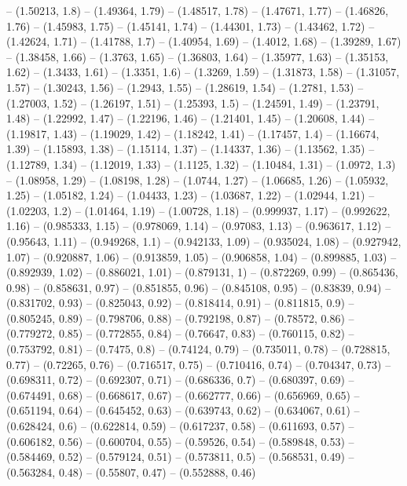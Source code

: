 -- (1.50213, 1.8)
-- (1.49364, 1.79)
-- (1.48517, 1.78)
-- (1.47671, 1.77)
-- (1.46826, 1.76)
-- (1.45983, 1.75)
-- (1.45141, 1.74)
-- (1.44301, 1.73)
-- (1.43462, 1.72)
-- (1.42624, 1.71)
-- (1.41788, 1.7)
-- (1.40954, 1.69)
-- (1.4012, 1.68)
-- (1.39289, 1.67)
-- (1.38458, 1.66)
-- (1.3763, 1.65)
-- (1.36803, 1.64)
-- (1.35977, 1.63)
-- (1.35153, 1.62)
-- (1.3433, 1.61)
-- (1.3351, 1.6)
-- (1.3269, 1.59)
-- (1.31873, 1.58)
-- (1.31057, 1.57)
-- (1.30243, 1.56)
-- (1.2943, 1.55)
-- (1.28619, 1.54)
-- (1.2781, 1.53)
-- (1.27003, 1.52)
-- (1.26197, 1.51)
-- (1.25393, 1.5)
-- (1.24591, 1.49)
-- (1.23791, 1.48)
-- (1.22992, 1.47)
-- (1.22196, 1.46)
-- (1.21401, 1.45)
-- (1.20608, 1.44)
-- (1.19817, 1.43)
-- (1.19029, 1.42)
-- (1.18242, 1.41)
-- (1.17457, 1.4)
-- (1.16674, 1.39)
-- (1.15893, 1.38)
-- (1.15114, 1.37)
-- (1.14337, 1.36)
-- (1.13562, 1.35)
-- (1.12789, 1.34)
-- (1.12019, 1.33)
-- (1.1125, 1.32)
-- (1.10484, 1.31)
-- (1.0972, 1.3)
-- (1.08958, 1.29)
-- (1.08198, 1.28)
-- (1.0744, 1.27)
-- (1.06685, 1.26)
-- (1.05932, 1.25)
-- (1.05182, 1.24)
-- (1.04433, 1.23)
-- (1.03687, 1.22)
-- (1.02944, 1.21)
-- (1.02203, 1.2)
-- (1.01464, 1.19)
-- (1.00728, 1.18)
-- (0.999937, 1.17)
-- (0.992622, 1.16)
-- (0.985333, 1.15)
-- (0.978069, 1.14)
-- (0.97083, 1.13)
-- (0.963617, 1.12)
-- (0.95643, 1.11)
-- (0.949268, 1.1)
-- (0.942133, 1.09)
-- (0.935024, 1.08)
-- (0.927942, 1.07)
-- (0.920887, 1.06)
-- (0.913859, 1.05)
-- (0.906858, 1.04)
-- (0.899885, 1.03)
-- (0.892939, 1.02)
-- (0.886021, 1.01)
-- (0.879131, 1)
-- (0.872269, 0.99)
-- (0.865436, 0.98)
-- (0.858631, 0.97)
-- (0.851855, 0.96)
-- (0.845108, 0.95)
-- (0.83839, 0.94)
-- (0.831702, 0.93)
-- (0.825043, 0.92)
-- (0.818414, 0.91)
-- (0.811815, 0.9)
-- (0.805245, 0.89)
-- (0.798706, 0.88)
-- (0.792198, 0.87)
-- (0.78572, 0.86)
-- (0.779272, 0.85)
-- (0.772855, 0.84)
-- (0.76647, 0.83)
-- (0.760115, 0.82)
-- (0.753792, 0.81)
-- (0.7475, 0.8)
-- (0.74124, 0.79)
-- (0.735011, 0.78)
-- (0.728815, 0.77)
-- (0.72265, 0.76)
-- (0.716517, 0.75)
-- (0.710416, 0.74)
-- (0.704347, 0.73)
-- (0.698311, 0.72)
-- (0.692307, 0.71)
-- (0.686336, 0.7)
-- (0.680397, 0.69)
-- (0.674491, 0.68)
-- (0.668617, 0.67)
-- (0.662777, 0.66)
-- (0.656969, 0.65)
-- (0.651194, 0.64)
-- (0.645452, 0.63)
-- (0.639743, 0.62)
-- (0.634067, 0.61)
-- (0.628424, 0.6)
-- (0.622814, 0.59)
-- (0.617237, 0.58)
-- (0.611693, 0.57)
-- (0.606182, 0.56)
-- (0.600704, 0.55)
-- (0.59526, 0.54)
-- (0.589848, 0.53)
-- (0.584469, 0.52)
-- (0.579124, 0.51)
-- (0.573811, 0.5)
-- (0.568531, 0.49)
-- (0.563284, 0.48)
-- (0.55807, 0.47)
-- (0.552888, 0.46)
